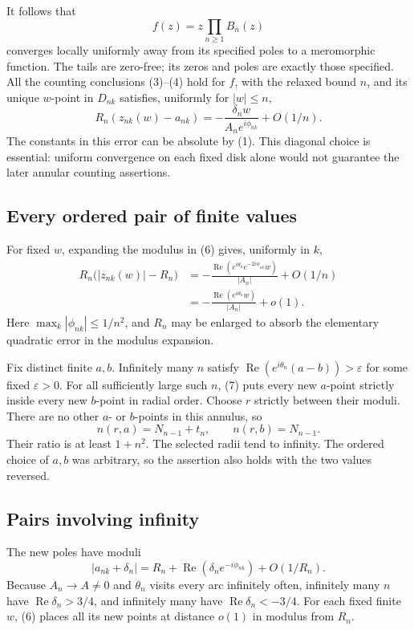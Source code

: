 It follows that
\[
 f(z)=z\prod_{n\ge1}B_n(z)
\]
converges locally uniformly away from its specified poles to a meromorphic function. The tails are zero-free; its zeros and poles are exactly those specified. All the counting conclusions (3)--(4) hold for $f$, with the relaxed bound $n$, and its unique $w$-point in $D_{nk}$ satisfies, uniformly for $|w|\le n$,
\[
 R_n(z_{nk}(w)-a_{nk})
 =-\frac{\delta_n w}{A_ne^{i\phi_{nk}}}+O(1/n).
 \tag{6}
\]
The constants in this error can be absolute by (1). This diagonal choice is essential: uniform convergence on each fixed disk alone would not guarantee the later annular counting assertions.

\subsection*{Every ordered pair of finite values}
For fixed $w$, expanding the modulus in (6) gives, uniformly in $k$,
\[
 \begin{split}
 R_n\bigl(|z_{nk}(w)|-R_n\bigr)
 &=-\frac{\operatorname{Re}(e^{i\theta_n}e^{-2i\phi_{nk}}w)}
             {|A_n|}+O(1/n)\\
 &=-\frac{\operatorname{Re}(e^{i\theta_n}w)}{|A_n|}+o(1).
 \end{split}
 \tag{7}
\]
Here $\max_k|\phi_{nk}|\le1/n^2$, and $R_n$ may be enlarged to absorb the elementary quadratic error in the modulus expansion.

Fix distinct finite $a,b$. Infinitely many $n$ satisfy
$\operatorname{Re}(e^{i\theta_n}(a-b))>\varepsilon$ for some fixed $\varepsilon>0$. For all sufficiently large such $n$, (7) puts every new $a$-point strictly inside every new $b$-point in radial order. Choose $r$ strictly between their moduli. There are no other $a$- or $b$-points in this annulus, so
\[
 n(r,a)=N_{n-1}+t_n,\qquad n(r,b)=N_{n-1}.
\]
Their ratio is at least $1+n^2$. The selected radii tend to infinity. The ordered choice of $a,b$ was arbitrary, so the assertion also holds with the two values reversed.

\subsection*{Pairs involving infinity}
The new poles have moduli
\[
 |a_{nk}+\delta_n|
 =R_n+\operatorname{Re}(\delta_ne^{-i\phi_{nk}})+O(1/R_n).
\]
Because $A_n\to A\ne0$ and $\theta_n$ visits every arc infinitely often, infinitely many $n$ have $\operatorname{Re}\delta_n>3/4$, and infinitely many have $\operatorname{Re}\delta_n<-3/4$.
For each fixed finite $w$, (6) places all its new points at distance $o(1)$ in modulus from $R_n$.

